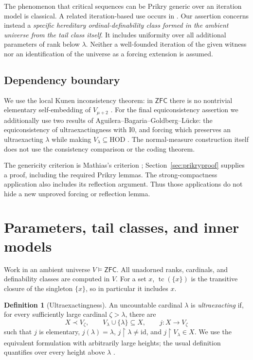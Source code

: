 \documentclass[11pt,letterpaper]{article}
\theoremstyle{definition}
\newtheorem{definition}{Definition}[section]
\numberwithin{equation}{section}
\newcommand{\ZFC}{\mathsf{ZFC}}
\newcommand{\HOD}{\mathrm{HOD}}
\newcommand{\id}{\mathrm{id}}
\newcommand{\restr}{\mathbin{\upharpoonright}}
\newcommand{\Izero}{\mathrm{I0}}
\newcommand{\tc}{\operatorname{tc}}
\begin{document}
The phenomenon that critical sequences can be Prikry generic over an
iteration model is classical. A related iteration-based use occurs in
\cite[Section~5.2]{abgl}. Our assertion concerns instead a
\emph{specific hereditary ordinal-definability class formed in the
ambient universe from the tail class itself}. It includes uniformity over
all additional parameters of rank below $\lambda$. Neither a well-founded
iteration of the given witness nor an identification of the universe as
a forcing extension is assumed.

\subsection{Dependency boundary}

We use the local Kunen inconsistency theorem: in $\ZFC$ there is no
nontrivial elementary self-embedding of $V_{\mu+2}$
\cite{kunen}. For the final equiconsistency assertion we additionally use
two results of Aguilera--Bagaria--Goldberg--L\"ucke: the equiconsistency of
ultraexactingness with $\Izero$, and forcing which preserves an
ultraexacting $\lambda$ while making $V_\lambda\subseteq\HOD$
\cite[Theorem~A and Proposition~3.9]{abgl}.
The normal-measure construction itself does not use the consistency
comparison or the coding theorem.

The genericity criterion is Mathias's criterion \cite{mathias};
Section~\ref{sec:prikryproof} supplies a proof, including the required
Prikry lemmas. The strong-compactness application also includes its
reflection argument. Thus those applications do not hide a new
unproved forcing or reflection lemma.

\section{Parameters, tail classes, and inner models}\label{sec:notation}

Work in an ambient universe $V\models\ZFC$. All unadorned ranks,
cardinals, and definability classes are computed in $V$.
For a set $x$, $\tc(\{x\})$ is the transitive closure of the singleton
$\{x\}$, so in particular it includes $x$.

\begin{definition}[Ultraexactingness]\label{def:uex}
An uncountable cardinal $\lambda$ is \emph{ultraexacting} if, for every
sufficiently large cardinal $\zeta>\lambda$, there are
\[
 X\prec V_\zeta,\qquad
 V_\lambda\cup\{\lambda\}\subseteq X,\qquad
 j:X\longrightarrow V_\zeta
\]
such that $j$ is elementary, $j(\lambda)=\lambda$,
$j\restr\lambda\ne\id$, and $j\restr V_\lambda\in X$.
We use the equivalent formulation with arbitrarily large heights; the
usual definition quantifies over every height above $\lambda$
\cite[Definition~3.3 and Lemma~3.2]{abl}.
\end{definition}
\end{document}
